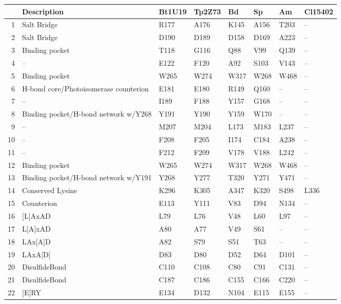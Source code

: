 \begin{table}[tbp]
\centering
\begin{tabular}{rlllllll}
  \hline
\hline
 & Description & Bt1U19 & Tp2Z73 & Bd & Sp & Am & Cl15402 \\ 
  \hline
1 & Salt Bridge & R177 & A176 & K145 & A156 & T203 & -- \\ 
  2 & Salt Bridge & D190 & D189 & D158 & D169 & A223 & -- \\ 
   \hline
3 & Binding pocket & T118 & G116 & Q88 & V99 & Q139 & -- \\ 
  4 & -- & E122 & F120 & A92 & S103 & V143 & -- \\ 
  5 & Binding pocket & W265 & W274 & W317 & W268 & W468 & -- \\ 
  6 & H-bond core/Photoisomerase counterion & E181 & E180 & R149 & Q160 & -- & -- \\ 
  7 & -- & I189 & F188 & Y157 & G168 & -- & -- \\ 
  8 & Binding pocket/H-bond network w/Y268 & Y191 & Y190 & Y159 & W170 & -- & -- \\ 
  9 & -- & M207 & M204 & L173 & M183 & L237 & -- \\ 
  10 & -- & F208 & F205 & I174 & C184 & A238 & -- \\ 
  11 & -- & F212 & F209 & V178 & V188 & L242 & -- \\ 
  12 & Binding pocket & W265 & W274 & W317 & W268 & W468 & -- \\ 
  13 & Binding pocket/H-bond network w/Y191 & Y268 & Y277 & T320 & Y271 & Y471 & -- \\ 
   \hline
14 & Conserved Lysine & K296 & K305 & A347 & K320 & S498 & L336 \\ 
  15 & Counterion & E113 & Y111 & V83 & D94 & N134 & -- \\ 
   \hline
16 & [L]AxAD & L79 & L76 & V48 & L60 & L97 & -- \\ 
  17 & L[A]xAD & A80 & A77 & V49 & S61 & -- & -- \\ 
  18 & LAx[A]D & A82 & S79 & S51 & T63 & -- & -- \\ 
  19 & LAxA[D] & D83 & D80 & D52 & D64 & D101 & -- \\ 
   \hline
20 & DisulfideBond & C110 & C108 & C80 & C91 & C131 & -- \\ 
  21 & DisulfideBond & C187 & C186 & C155 & C166 & C220 & -- \\ 
   \hline
22 & [E]RY & E134 & D132 & N104 & E115 & E155 & -- \\ 

\end{tabular}
\end{table}
